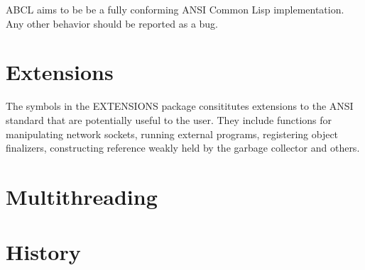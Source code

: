 ABCL aims to be be a fully conforming ANSI Common Lisp
implementation.  Any other behavior should be reported as a bug.

\section{Extensions}

The symbols in the EXTENSIONS package consititutes extensions to the
ANSI standard that are potentially useful to the user.  They include
functions for manipulating network sockets, running external programs,
registering object finalizers, constructing reference weakly held by
the garbage collector and others.



\section{Multithreading}



\section{History}




